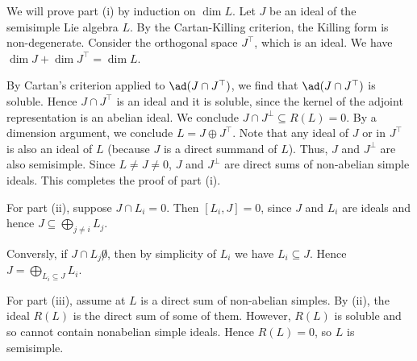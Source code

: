 We will prove part (i) by induction on $\dim L$. Let $J$ be an ideal of
the semisimple Lie algebra $L$. By the Cartan-Killing criterion, the Killing
form is non-degenerate. Consider the orthogonal space $J^\top$, which is an
ideal. We have $\dim J + \dim J^\top = \dim L$.

By Cartan's criterion applied to $\ad(J\cap J^\top)$, we find that
$\ad(J\cap J^\top)$ is soluble. Hence $J\cap J^\top$ is an ideal and it is
soluble, since the kernel of the adjoint representation is an abelian ideal.
We conclude $J\cap J^\perp \subseteq R(L) = 0$. By a dimension argument, we
conclude $L = J\oplus J^\top$. Note that any ideal of $J$ or in $J^\top$
is also an ideal of $L$ (because $J$ is a direct summand of $L$). Thus,
$J$ and $J^\perp$ are also semisimple. Since $L\neq J \neq 0$,  $J$ and $J^\perp$
are direct sums of non-abelian simple ideals. This completes the proof of
part (i).

For part (ii), suppose $J\cap L_i = 0$. Then $[L_i, J] = 0$, since $J$ and $L_i$
are ideals and hence $J \subseteq \bigoplus_{j\neq i} L_j$.

Conversly, if $J\cap L_j \not 0$, then by simplicity of $L_i$ we have $L_i \subseteq J$.
Hence $J = \bigoplus_{L_i \subseteq J}L_i$.

For part (iii), assume at $L$ is a direct sum of non-abelian simples. By
(ii), the ideal $R(L)$ is the direct sum of some of them. However,
$R(L)$ is soluble and so cannot contain nonabelian simple ideals. Hence
$R(L) = 0$, so $L$ is semisimple.
